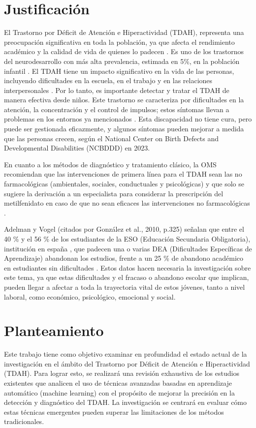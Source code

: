 \documentclass[10pt,journal,compsoc]{IEEEtran}
\begin{document}
\section{Justificación}
El Trastorno por Déficit de Atención e Hiperactividad (TDAH), representa una preocupación significativa en toda la población, ya que afecta el rendimiento académico y la calidad de vida de quienes lo padecen \cite{aparicio2024tecnologias}. Es uno de los trastornos del neurodesarrollo con más alta prevalencia, estimada en 5\%, en la población infantil \cite{boechi2023tecnologias}. El TDAH tiene un impacto significativo en la vida de las personas, incluyendo dificultades en la escuela, en el trabajo y en las relaciones interpersonales \cite{rivera2016elevada}. Por lo tanto, es importante detectar y tratar el TDAH de manera efectiva desde niños. Este trastorno se caracteriza por dificultades en la atención, la concentración y el control de impulsos; estos síntomas llevan a problemas en los entornos ya mencionados \cite{santarrosaanalisis}. Esta discapacidad no tiene cura, pero puede ser gestionada eficazmente, y algunos síntomas pueden mejorar a medida que las personas crecen, según el National Center on Birth Defects and Developmental Disabilities (NCBDDD) en 2023.

En cuanto a los métodos de diagnóstico y tratamiento clásico, la OMS recomiendan que las intervenciones de primera línea para el TDAH sean las no farmacológicas \cite{normasfarmacologicas} (ambientales, sociales, conductuales y psicológicas) y que solo se sugiere la derivación a un especialista para considerar la prescripción del metilfenidato en caso de que no sean eficaces las intervenciones no farmacológicas \cite{boechi2023tecnologias}.

Adelman y Vogel (citados por González et al., 2010, p.325) señalan que entre el 40 \% y el 56 \% de los estudiantes de la ESO (Educación Secundaria Obligatoria), institución en españa \cite{sistemaeducativoespana}, que padecen una o varias DEA (Dificultades Específicas de Aprendizaje) abandonan los estudios, frente a un 25 \% de abandono académico en estudiantes sin dificultades \cite{consecuenciassociales}. Estos datos hacen necesaria la investigación sobre este tema, ya que estas dificultades y el fracaso o abandono escolar que implican, pueden llegar a afectar a toda la trayectoria vital de estos jóvenes, tanto a nivel laboral, como económico, psicológico, emocional y social.

\section{Planteamiento}
Este trabajo tiene como objetivo examinar en profundidad el estado actual de la investigación en el ámbito del Trastorno por Déficit de Atención e Hiperactividad (TDAH). Para lograr esto, se realizará una revisión exhaustiva de los estudios existentes que analicen el uso de técnicas avanzadas basadas en aprendizaje automático (machine learning) con el propósito de mejorar la precisión en la detección y diagnóstico del TDAH. La investigación se centrará en evaluar cómo estas técnicas emergentes pueden superar las limitaciones de los métodos tradicionales.
\end{document}

